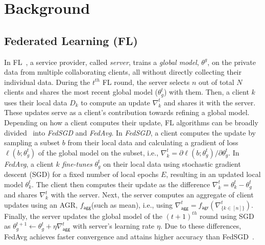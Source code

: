\section{Background}\label{sec:background}
    
\subsection{Federated Learning (FL)}\label{background:FL}
In FL~\cite{kairouz2019advances, mcmahan2017communication, konevcny2016federated}, a service provider, called \emph{server}, trains a \emph{global model}, $\theta^g$, on the private data from multiple collaborating clients, all without directly collecting their individual data.
During the $t^{th}$ FL round, the server selects $n$ out of total $N$ clients and shares the most recent global model ($\theta^t_g$) with them. 
Then, a client $k$ uses their local data $D_k$ to compute an update $\nabla^t_k$ and shares it with the server. These updates serve as a client's contribution towards refining a global model. 
Depending on how a client computes their update, FL algorithms can be broadly divided~\cite{mcmahan2017communication} into \emph{FedSGD} and \emph{FedAvg}. 
In \emph{FedSGD}, a client computes the update by sampling a subset $b$ from their local data and calculating a gradient of loss $\ell(b;\theta^t_g)$ of the global model on the subset, i.e., $\nabla^t_k = {\partial \ell(b; \theta^t_g)}/{\partial \theta^t_g}$. In \emph{FedAvg}, a client $k$ \emph{fine-tunes} $\theta^t_g$ on their local data using stochastic gradient descent (SGD) for a fixed number of local epochs $E$, resulting in an updated local model $\theta^t_k$. The client then computes their update as the difference $\nabla^t_k= \theta^t_k-\theta^t_g$ and shares $\nabla^t_k$ with the server.
Next, the server computes an aggregate of client updates using an AGR, $f_\mathsf{agg}$(such as mean), i.e., using $\nabla^t_\mathsf{agg}= f_\mathsf{agr}(\nabla^t_{\{k\in[n]\}})$. Finally, the server updates the global model of the $(t+1)^{th}$ round using SGD as $\theta^{t+1}_g\leftarrow \theta^{t}_g+\eta\nabla^t_\mathsf{agg}$ with server's learning rate $\eta$. Due to these differences, FedAvg achieves faster convergence and attains higher accuracy than FedSGD~\cite{mcmahan2017communication}.


